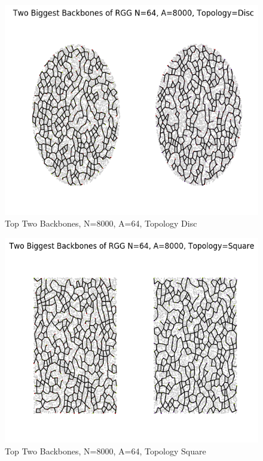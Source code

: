 \documentclass{article}
\begin{document}
    \begin{figure}
      \centering
      \label{backbone_64_8000_Disc}
      \includegraphics[width=1 \textwidth]{backbone/backbone_64_8000_Disc.png}
      \caption{Top Two Backbones, N=8000, A=64, Topology Disc}
    \end{figure}

    \begin{figure}
      \centering
      \label{backbone_64_8000_Square}
      \includegraphics[width=1 \textwidth]{backbone/backbone_64_8000_Square.png}
      \caption{Top Two Backbones, N=8000, A=64, Topology Square}
    \end{figure}
\end{document}
